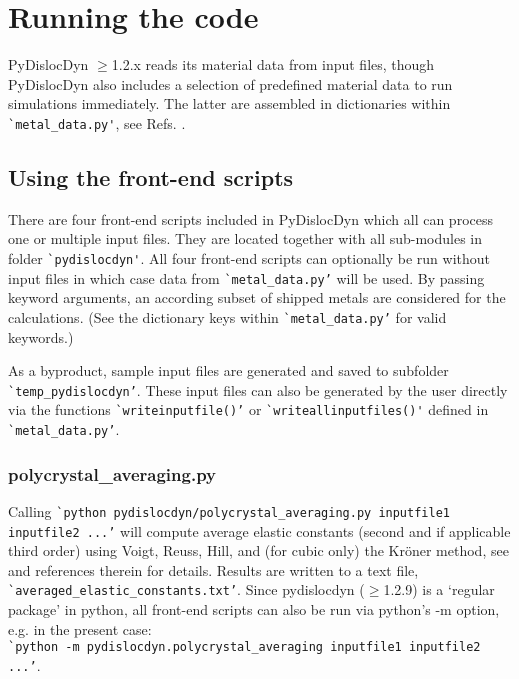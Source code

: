 \documentclass[11pt,letterpaper,oneside,pdftex]{article}
\begin{document}
\section{Running the code}

PyDislocDyn $\ge$1.2.x reads its material data from input files, though PyDislocDyn also includes a selection of predefined material data to run simulations immediately.
The latter are assembled in dictionaries within \verb|`metal_data.py'|, see Refs. \cite{Hertzberg:2012,Kaye:2004,CRCHandbook,Wasserbaech:1990,Seeger:1960,Graham:1968,Smith:1966,Kiewel:1996,Samsonov:1968,Epstein:1965,Lowrie:1967,Thomas:1968,Hiki:1966,Leese:1968,Voronov:1978,Alers:1960,Saunders:1986,Powell:1984,Naimon:1971,Riley:1973,Swartz:1972,Rao:1973,Swartz:1970,Singh:1992,Barrera:1993,Jiles:1981,Yogurtcu:1985,Srinivasan:1973a,Rao:1980,Vekilov:2016,Suzuki:1971}.

\subsection{Using the front-end scripts}
\label{sec:frontends}

There are four front-end scripts included in PyDislocDyn which all can process one or multiple input files.
They are located together with all sub-modules in folder \verb|`pydislocdyn'|.
All four front-end scripts can optionally be run without input files in which case data from \verb|`metal_data.py’| will be used.
By passing keyword arguments, an according subset of shipped metals are considered for the calculations.
(See the dictionary keys within \verb|`metal_data.py’| for valid keywords.)

As a byproduct, sample input files are generated and saved to subfolder \verb|`temp_pydislocdyn’|.
These input files can also be generated by the user directly via the functions \verb|`writeinputfile()’| or \verb|`writeallinputfiles()'| defined in \verb|`metal_data.py’|.


\subsubsection{polycrystal\_averaging.py}

Calling \verb|`python pydislocdyn/polycrystal_averaging.py inputfile1 inputfile2 ...’| will compute average elastic constants (second and if applicable third order) using Voigt, Reuss, Hill, and (for cubic only) the Kr{\"o}ner method, see \cite{Blaschke:2017Poly} and references therein for details.
Results are written to a text file,
\verb|`averaged_elastic_constants.txt’|.
Since pydislocdyn ($\ge$1.2.9) is a `regular package' in python, all front-end scripts can also be run via python's -m option, e.g. in the present case:\\
\verb|`python -m pydislocdyn.polycrystal_averaging inputfile1 inputfile2 ...’|.
\end{document}
